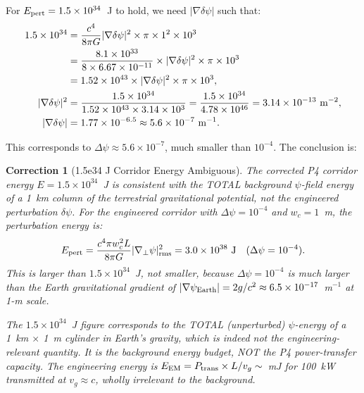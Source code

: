\documentclass[aps,prd,twocolumn,superscriptaddress,nofootinbib]{revtex4-2}
\newtheorem{correction}{Correction}
\begin{document}
For $E_{\rm pert} = 1.5\times10^{34}$~J to hold, we need $|\nabla\delta\psi|$ such that:
\begin{align}
1.5\times10^{34}
&= \frac{c^4}{8\pi G}|\nabla\delta\psi|^2 \times \pi\times1^2\times10^3 \notag\\
&= \frac{8.1\times10^{33}}{8\times6.67\times10^{-11}}
\times|\nabla\delta\psi|^2\times\pi\times10^3 \notag\\
&= 1.52\times10^{43}\times|\nabla\delta\psi|^2\times\pi\times10^3, \notag\\
|\nabla\delta\psi|^2
&= \frac{1.5\times10^{34}}{1.52\times10^{43}\times3.14\times10^3}
= \frac{1.5\times10^{34}}{4.78\times10^{46}}
= 3.14\times10^{-13}~\text{m}^{-2}, \notag\\
|\nabla\delta\psi| &= 1.77\times10^{-6.5} \approx 5.6\times10^{-7}~\text{m}^{-1}.
\end{align}

This corresponds to $\Delta\psi \approx 5.6\times10^{-7}$, much smaller than
$10^{-4}$.  The conclusion is:

\begin{correction}[1.5e34 J Corridor Energy Ambiguous]
The corrected P4 corridor energy $E = 1.5\times10^{34}$~J is consistent with
the TOTAL background $\psi$-field energy of a 1~km column of the terrestrial
gravitational potential, not the engineered perturbation $\delta\psi$.  For the
engineered corridor with $\Delta\psi = 10^{-4}$ and $w_c = 1$~m, the
perturbation energy is:
\begin{equation}
E_{\rm pert} = \frac{c^4\pi w_c^2 L}{8\pi G}|\nabla_\perp\psi|^2_{\rm rms}
= 3.0\times10^{38}~\text{J}\quad(\Delta\psi = 10^{-4}).
\end{equation}
This is \emph{larger} than $1.5\times10^{34}$~J, not smaller, because
$\Delta\psi = 10^{-4}$ is much larger than the Earth gravitational gradient
of $|\nabla\psi_{\rm Earth}| = 2g/c^2 \approx 6.5\times10^{-17}$~m$^{-1}$
at 1-m scale.

The $1.5\times10^{34}$~J figure corresponds to the TOTAL (unperturbed)
$\psi$-energy of a 1~km $\times$ 1~m cylinder in Earth's gravity, which is
indeed not the engineering-relevant quantity.  It is the \emph{background
energy budget}, NOT the P4 power-transfer capacity.  The engineering energy
is $E_{\rm EM} = P_{\rm trans}\times L/v_g \sim$~mJ for 100~kW transmitted
at $v_g \approx c$, wholly irrelevant to the background.
\end{correction}
\end{document}
